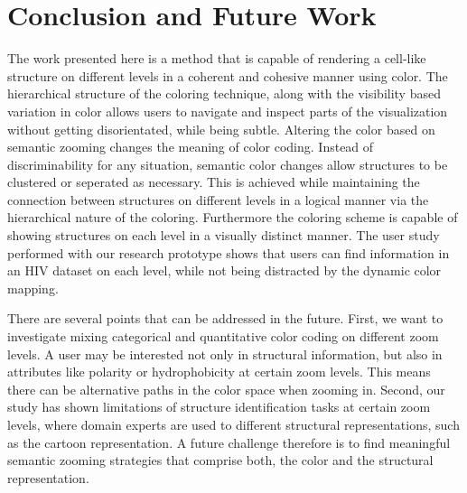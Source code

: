 \documentclass{egpubl}
\begin{document}
	\section{Conclusion and Future Work}
	The work presented here is a method that is capable of rendering a cell-like structure on different levels in a coherent and cohesive manner using color. 
	The hierarchical structure of the coloring technique, along with the visibility based variation in color allows users to navigate and inspect parts of the visualization without getting disorientated, while being subtle.
	Altering the color based on semantic zooming changes the meaning of color coding.
	Instead of discriminability for any situation, semantic color changes allow structures to be clustered or seperated as necessary.
	This is achieved while maintaining the connection between structures on different levels in a logical manner via the hierarchical nature of the coloring.
	Furthermore the coloring scheme is capable of showing structures on each level in a visually distinct manner. 
	The user study performed with our research prototype shows that users can find information in an HIV dataset on each level, while not being distracted by the dynamic color mapping. 
	
	There are several points that can be addressed in the future. 
	First, we want to investigate mixing categorical and quantitative color coding on different zoom levels. 
	A user may be interested not only in structural information, but also in attributes like polarity or hydrophobicity at certain zoom levels. 
	This means there can be alternative paths in the color space when zooming in. 
	Second, our study has shown limitations of structure identification tasks at certain zoom levels, where domain experts are used to different structural representations, such as the cartoon representation. 
	A future challenge therefore is to find meaningful semantic zooming strategies that comprise both, the color and the structural representation. 
	
\end{document}

